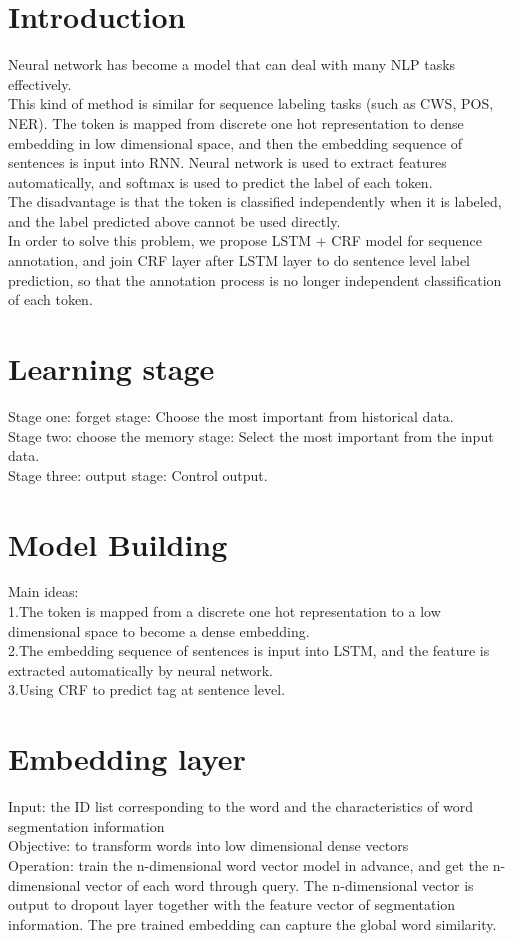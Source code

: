 \section{Introduction}\label{sec-intro}


\begin{JournalOnly}
\end{JournalOnly}
Neural network has become a model that can deal with many NLP tasks effectively.\\
This kind of method is similar for sequence labeling tasks (such as CWS, POS, NER). The token is mapped from discrete one hot representation to dense embedding in low dimensional space, and then the embedding sequence of sentences is input into RNN. Neural network is used to extract features automatically, and softmax is used to predict the label of each token.\\
The disadvantage is that the token is classified independently when it is labeled, 
and the label predicted above cannot be used directly.\\
In order to solve this problem, we propose LSTM + CRF model for sequence annotation,
 and join CRF layer after LSTM layer to do sentence level label prediction, 
 so that the annotation process is no longer independent classification of each token.
\section{Learning stage} \label{sec-experiment}
Stage one: forget stage:
Choose the most important from historical data.\\
Stage two: choose the memory stage:
Select the most important from the input data.\\
Stage three: output stage:
Control output.
\section{Model Building} \label{sec-conclusions}
Main ideas:\\
1.The token is mapped from a discrete one hot representation to a low dimensional space to become a dense embedding.\\
2.The embedding sequence of sentences is input into LSTM, and the feature is extracted automatically by neural network.\\
3.Using CRF to predict tag at sentence level.
\section{Embedding layer} \label{sec-conclusions}
Input: the ID list corresponding to the word and the characteristics of word segmentation information\\
Objective: to transform words into low dimensional dense vectors\\
Operation: train the n-dimensional word vector model in advance, and get the n-dimensional vector of each word through query. The n-dimensional vector is output to dropout layer together with the feature vector of segmentation information.
The pre trained embedding can capture the global word similarity.
